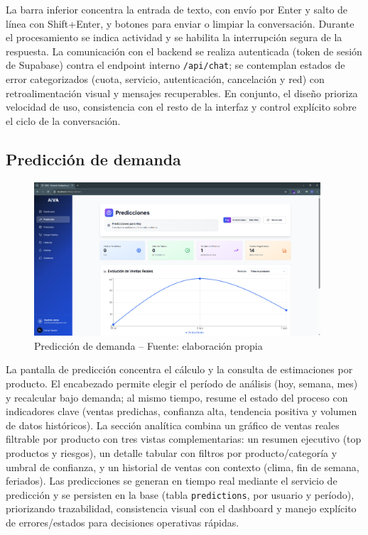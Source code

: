 La barra inferior concentra la entrada de texto, con envío por Enter y salto de línea con Shift+Enter, y botones para enviar o limpiar la conversación. Durante el procesamiento se indica actividad y se habilita la interrupción segura de la respuesta. La comunicación con el backend se realiza autenticada (token de sesión de Supabase) contra el endpoint interno \texttt{/api/chat}; se contemplan estados de error categorizados (cuota, servicio, autenticación, cancelación y red) con retroalimentación visual y mensajes recuperables. En conjunto, el diseño prioriza velocidad de uso, consistencia con el resto de la interfaz y control explícito sobre el ciclo de la conversación.


\subsection{Predicción de demanda}
\begin{figure}[!htbp]
\centering
\includegraphics[width=0.95\textwidth]{images/prediccionPage.png}
\caption{Predicción de demanda -- Fuente: elaboración propia}
\label{fig:ui-prediccion}
\end{figure}
La pantalla de predicción concentra el cálculo y la consulta de estimaciones por producto. El encabezado permite elegir el período de análisis (hoy, semana, mes) y recalcular bajo demanda; al mismo tiempo, resume el estado del proceso con indicadores clave (ventas predichas, confianza alta, tendencia positiva y volumen de datos históricos). La sección analítica combina un gráfico de ventas reales filtrable por producto con tres vistas complementarias: un resumen ejecutivo (top productos y riesgos), un detalle tabular con filtros por producto/categoría y umbral de confianza, y un historial de ventas con contexto (clima, fin de semana, feriados). Las predicciones se generan en tiempo real mediante el servicio de predicción y se persisten en la base (tabla \texttt{predictions}, por usuario y período), priorizando trazabilidad, consistencia visual con el dashboard y manejo explícito de errores/estados para decisiones operativas rápidas.

